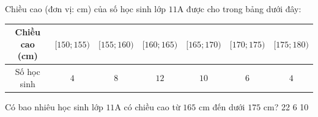 \begin{ex}%
	Chiều cao (đơn vị: cm) của số học sinh lớp $11\text{A}$ được cho trong bảng dưới đây: 
	\begin{center}
		\begin{tabular}{|c|c|c|c|c|c|c|}
			 \hline
			Chiều cao (cm) & $[150;155)$ & $[155;160)$ & $[160;165)$ & $[165;170)$ & $[170;175)$ & $[175;180)$  \\
			 \hline
			Số học sinh  & $4$ & $8$ & $12$ & $10$ & $6$ & $4$ \\
			 \hline
		\end{tabular}
	\end{center}
	Có bao nhiêu học sinh lớp $11\text{A}$  có chiều cao từ $165$ cm đến dưới $175$ cm?
	 \choice
		{22} 
		{} 
		{6} 
		 {10}
\end{ex}

